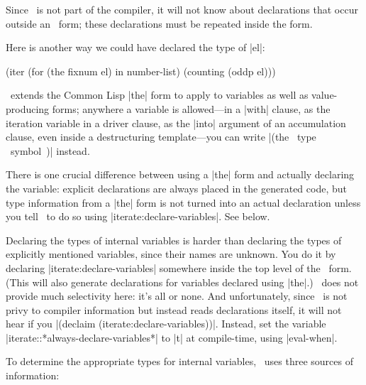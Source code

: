 Since \iter\ is not part of the compiler, it will not know
about declarations that occur outside an \iter\ form; these
declarations must be repeated inside the form.

Here is another way we could have declared the type of |el|:
\begin{program}
(iter (for (the fixnum el) in number-list)
      (counting (oddp el)))
\end{program}
\iter\ extends the Common Lisp |the|
form to apply to variables as well as value-producing forms; anywhere
a variable is allowed---in a |with| clause, as the iteration
variable in a driver clause, as the |into| argument of an
accumulation clause, even inside a destructuring template---you can
write |(the ~type~ ~symbol~)| instead.

There is one crucial difference between using a |the| form and
actually declaring the variable: explicit declarations are always
placed in the generated code, but type information from a |the|
form is not turned into an actual declaration unless you tell \iter\
to do so using |iterate:declare-variables|.  See below.

\begin{sloppypar}
Declaring the types of internal variables is harder than declaring the
types of explicitly mentioned variables, since their names
are unknown.  You do it by declaring |iterate:declare-variables|
somewhere inside the top level of the \iter\ form.  (This will also
generate declarations for variables declared using |the|.)
\iter\ does not provide much selectivity here: it's all or none. 
And unfortunately, since \iter\ is not privy to compiler information
but instead reads declarations itself, it will not hear if you
|(declaim (iterate:declare-variables))|.  Instead, set the variable 
|iterate::*always-declare-variables*| to |t| at
compile-time, using |eval-when|.
\end{sloppypar}

To determine the appropriate types for internal variables, \iter\ uses
three sources of information:

